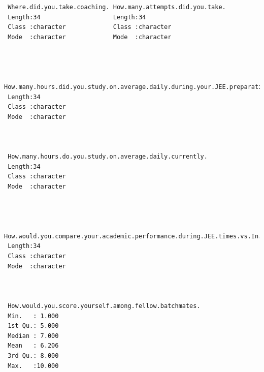 \documentclass[
  letterpaper,
  DIV=11,
  numbers=noendperiod]{scrartcl}
\begin{document}
\begin{verbatim}
                                                                
                                                                
 Where.did.you.take.coaching. How.many.attempts.did.you.take.
 Length:34                    Length:34                      
 Class :character             Class :character               
 Mode  :character             Mode  :character               
                                                             
                                                             
                                                             
 How.many.hours.did.you.study.on.average.daily.during.your.JEE.preparation.
 Length:34                                                                 
 Class :character                                                          
 Mode  :character                                                          
                                                                           
                                                                           
                                                                           
 How.many.hours.do.you.study.on.average.daily.currently.
 Length:34                                              
 Class :character                                       
 Mode  :character                                       
                                                        
                                                        
                                                        
 How.would.you.compare.your.academic.performance.during.JEE.times.vs.In.IIT.
 Length:34                                                                  
 Class :character                                                           
 Mode  :character                                                           
                                                                            
                                                                            
                                                                            
 How.would.you.score.yourself.among.fellow.batchmates.
 Min.   : 1.000                                       
 1st Qu.: 5.000                                       
 Median : 7.000                                       
 Mean   : 6.206                                       
 3rd Qu.: 8.000                                       
 Max.   :10.000                                       
\end{verbatim}
\end{document}
